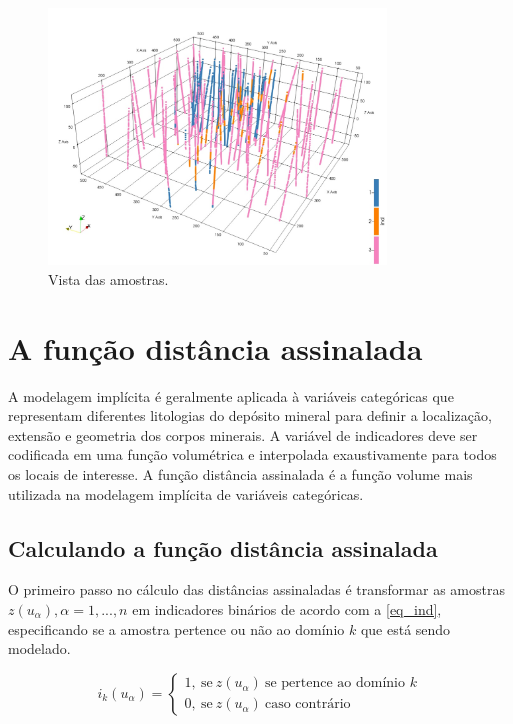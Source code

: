 \begin{figure}[!htb]
	\caption{\label{dataset}Vista das amostras.}
	\begin{center}
		\includegraphics[width=0.8\textwidth]{capitulo_2/dados.jpeg}
	\end{center}
\end{figure}

\section{A função distância assinalada}

A modelagem implícita é geralmente aplicada à variáveis categóricas que representam diferentes litologias do depósito mineral para definir a localização, extensão e geometria dos corpos minerais. A variável de indicadores deve ser codificada em uma função volumétrica e interpolada exaustivamente para todos os locais de interesse. A função distância assinalada \cite{osherlevelsetmethods}  é a função volume mais utilizada na modelagem implícita de variáveis categóricas.

\subsection{Calculando a função distância assinalada}

O primeiro passo no cálculo das distâncias assinaladas é transformar as amostras ${z(u_\alpha),\alpha=1,...,n}$ em indicadores binários de acordo com a \autoref{eq_ind}, especificando se a amostra pertence ou não ao domínio $k$ que está sendo modelado.

\begin{equation}
	i_k(u_\alpha)=\begin{cases}
	1,\:\textrm{se}\:z(u_\alpha)\:\textrm{se pertence ao domínio $k$}\\
	0,\:\textrm{se}\:z(u_\alpha)\:\textrm{caso contrário}\end{cases}
    \label{eq_ind}
\end{equation}

